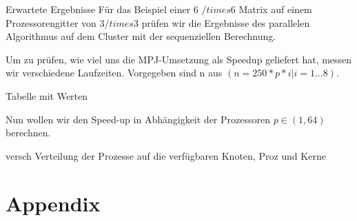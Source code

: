 \documentclass[
ngerman,
subtask=ruled %
]{tudaexercise}
\begin{document}
	

	\begin{task} {Erwartete Ergebnisse}
		Für das Beispiel einer 6 $/times$6 Matrix auf einem Prozessorengitter von 3$/times$3 prüfen wir die Ergebnisse des parallelen Algorithmus auf dem Cluster mit der sequenziellen Berechnung.
		
		Um zu prüfen, wie viel uns die MPJ-Umsetzung als Speedup geliefert hat, messen wir verschiedene Laufzeiten.
		Vorgegeben sind n aus $(n = 250 * p * i | i=1...8)$.
		
		Tabelle mit Werten
		
		Nun wollen wir den Speed-up in Abhängigkeit der Prozessoren $p \in (1, 64)$ berechnen.
		
		versch Verteilung der Prozesse auf die verfügbaren Knoten, Proz und Kerne
	\end{task}


	\appendix
	\section{Appendix}
	

	
	
\end{document}
